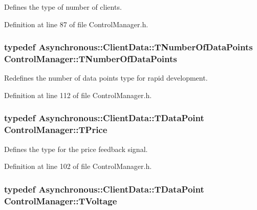 Defines the type of number of clients. 



Definition at line 87 of file Control\-Manager.\-h.

\hypertarget{class_control_manager_a90ca5d46699df9c6e67c96e36727eff1}{
\subsubsection[{T\-Number\-Of\-Data\-Points}]{\setlength{\rightskip}{0pt plus 5cm}typedef {\bf Asynchronous\-::\-Client\-Data\-::\-T\-Number\-Of\-Data\-Points} {\bf Control\-Manager\-::\-T\-Number\-Of\-Data\-Points}}}\label{class_control_manager_a90ca5d46699df9c6e67c96e36727eff1}


Redefines the number of data points type for rapid development. 



Definition at line 112 of file Control\-Manager.\-h.

\hypertarget{class_control_manager_acad2d80fd0659e3d979389de905e7b5b}{
\subsubsection[{T\-Price}]{\setlength{\rightskip}{0pt plus 5cm}typedef {\bf Asynchronous\-::\-Client\-Data\-::\-T\-Data\-Point} {\bf Control\-Manager\-::\-T\-Price}}}\label{class_control_manager_acad2d80fd0659e3d979389de905e7b5b}


Defines the type for the price feedback signal. 



Definition at line 102 of file Control\-Manager.\-h.

\hypertarget{class_control_manager_a336440023399b9165c117020f6b14ec3}{
\subsubsection[{T\-Voltage}]{\setlength{\rightskip}{0pt plus 5cm}typedef {\bf Asynchronous\-::\-Client\-Data\-::\-T\-Data\-Point} {\bf Control\-Manager\-::\-T\-Voltage}}}\label{class_control_manager_a336440023399b9165c117020f6b14ec3}


